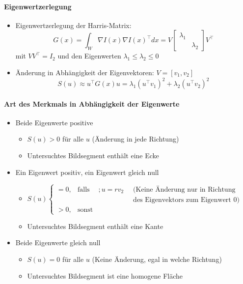 \documentclass[12pt, a4paper, oneside]{article}
\begin{document}
\paragraph*{Eigenwertzerlegung}
\begin{itemize}
    \item Eigenwertzerlegung der Harris-Matrix:
    $$
    G(x)=\int_W\nabla I(x)\nabla I(x)^\top dx=V \begin{bmatrix}
        \lambda_1 & \\
         & \lambda_2
    \end{bmatrix}
    V^\top
    $$
    mit $VV^\top =I_2$ und den Eigenwerten $\lambda_1\le \lambda_2\le 0$
    \item Änderung in Abhängigkeit der Eigenvektoren: $V=[v_1,v_2]$
    $$
    S(u)\approx u^\top G(x)u=\lambda_1(u^\top v_1)^2+\lambda_2(u^\top v_2)^2
    $$
\end{itemize}

\paragraph*{Art des Merkmals in Abhängigkeit der Eigenwerte}
\begin{itemize}
    \item Beide Eigenwerte positive
    \begin{itemize}
        \item $S(u)>0$ für alle $u$ (Änderung in jede Richtung)
        \item Untersuchtes Bildsegment enthält eine Ecke
    \end{itemize}
    \item Ein Eigenwert positiv, ein Eigenwert gleich null
    \begin{itemize}
        \item $S(u)\left\{\begin{matrix}
           =0,&\text{falls}&; u=rv_2\;\;&\text{(Keine Änderung nur in Richtung}\\ 
           &&&\text{des Eigenvektors zum Eigenwert 0)}  \\
           >0,&\text{sonst}&
           \end{matrix}\right.$
        \item Untersuchtes Bildsegment enthält eine Kante
    \end{itemize}
    \item Beide Eigenwerte gleich null
    \begin{itemize}
        \item $S(u)=0$ für alle $u$ (Keine Änderung, egal in welche Richtung)
        \item Untersuchtes Bildsegment ist eine homogene Fläche
    \end{itemize}
\end{itemize}
\end{document}
